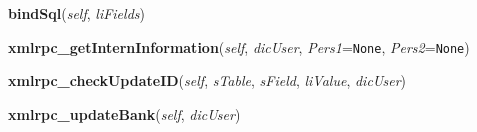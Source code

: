 \hspace{.8\funcindent}\begin{boxedminipage}{\funcwidth}

    \raggedright \textbf{bindSql}(\textit{self}, \textit{liFields})

\setlength{\parskip}{2ex}
\setlength{\parskip}{1ex}
    \end{boxedminipage}

    \label{cuon:Database:Database:xmlrpc_getInternInformation}

    \vspace{0.5ex}

\hspace{.8\funcindent}\begin{boxedminipage}{\funcwidth}

    \raggedright \textbf{xmlrpc\_getInternInformation}(\textit{self}, \textit{dicUser}, \textit{Pers1}={\tt None}, \textit{Pers2}={\tt None})

\setlength{\parskip}{2ex}
\setlength{\parskip}{1ex}
    \end{boxedminipage}

    \label{cuon:Database:Database:xmlrpc_checkUpdateID}

    \vspace{0.5ex}

\hspace{.8\funcindent}\begin{boxedminipage}{\funcwidth}

    \raggedright \textbf{xmlrpc\_checkUpdateID}(\textit{self}, \textit{sTable}, \textit{sField}, \textit{liValue}, \textit{dicUser})

\setlength{\parskip}{2ex}
\setlength{\parskip}{1ex}
    \end{boxedminipage}

    \label{cuon:Database:Database:xmlrpc_updateBank}

    \vspace{0.5ex}

\hspace{.8\funcindent}\begin{boxedminipage}{\funcwidth}

    \raggedright \textbf{xmlrpc\_updateBank}(\textit{self}, \textit{dicUser})

\setlength{\parskip}{2ex}
\setlength{\parskip}{1ex}
    \end{boxedminipage}

